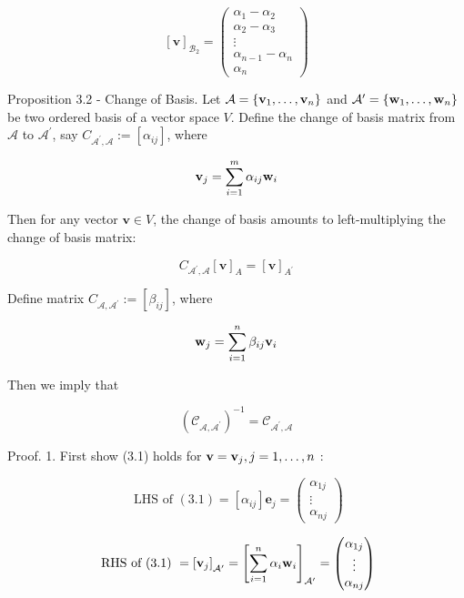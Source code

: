 \documentclass[11pt]{article}
\begin{document}
\[
{\left\lbrack  \mathbf{v}\right\rbrack  }_{{\mathcal{B}}_2} = \left( \begin{matrix} \alpha_1 - \alpha_2 \\  \alpha_2 - \alpha_{3} \\  \vdots \\  \alpha_{n - 1} - \alpha_n \\  \alpha_n \end{matrix}\right)
\]

Proposition 3.2 - Change of Basis. Let \(\mathcal{A} = \left\{  {{\bf v}_1,\ldots ,{\bf v}_n}\right\}\) and \({\mathcal{A}}^{\prime } = \left\{  {{\bf w}_1,\ldots ,{\bf w}_n}\right\}\) be two ordered basis of a vector space \(V\). Define the change of basis matrix from \(\mathcal{A}\) to \({\mathcal{A}}^{\prime }\), say \({C}_{{\mathcal{A}}^{\prime },\mathcal{A}} \mathrel{\text{ := }} \left\lbrack  \alpha_{ij}\right\rbrack\), where

\[
{\bf v}_{j} = \mathop{\sum }\limits_{{i = 1}}^{m}\alpha_{ij}{\bf w}_{i}
\]

Then for any vector \(\mathbf{v} \in  V\), the change of basis amounts to left-multiplying the change of basis matrix:

\[
{C}_{{\mathcal{A}}^{\prime },\mathcal{A}}{\left\lbrack  \mathbf{v}\right\rbrack  }_{A} = {\left\lbrack  \mathbf{v}\right\rbrack  }_{{A}^{\prime }} \tag{3.1}
\]

Define matrix \({C}_{\mathcal{A},{\mathcal{A}}^{\prime }} \mathrel{\text{ := }} \left\lbrack  \beta_{ij}\right\rbrack\), where

\[
{\bf w}_{j} = \mathop{\sum }\limits_{{i = 1}}^n\beta_{ij}{\bf v}_{i}
\]

Then we imply that

\[
{\left( {\mathcal{C}}_{\mathcal{A},{\mathcal{A}}^{\prime }}\right) }^{-1} = {\mathcal{C}}_{{\mathcal{A}}^{\prime },\mathcal{A}}
\]

Proof. 1. First show (3.1) holds for \(\mathbf{v} = {\bf v}_{j},j = 1,\ldots ,n\) :

\[
\text{ LHS of }\left( {3.1}\right)  = \left\lbrack  \alpha_{ij}\right\rbrack  {\mathbf{e}}_{j} = \left( \begin{matrix} \alpha_{1j} \\  \vdots \\  \alpha_{nj} \end{matrix}\right)
\]

\[
\text{ RHS of (3.1) } = {\left\lbrack  {\bf v}_{j}\right\rbrack  }_{{\mathcal{A}}^{\prime }} = {\left\lbrack  \mathop{\sum }\limits_{{i = 1}}^n\alpha_{i}{\bf w}_{i}\right\rbrack  }_{{\mathcal{A}}^{\prime }} = \left( \begin{matrix} \alpha_{1j} \\  \vdots \\  \alpha_{nj} \end{matrix}\right)
\]
\end{document}
